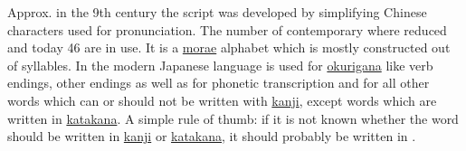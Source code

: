 

Approx. in the 9th century the \lhiragana{} script was developed by simplifying
Chinese characters used for pronunciation. The number of contemporary
\lhiragana{} where reduced and today 46 are in use. It is a
\hyperref[sec:Mora]{morae} alphabet which is mostly constructed out of
syllables. In the modern Japanese language \lhiragana{} is used for
\hyperref[sec:Okurigana]{okurigana} like verb endings, other endings as well as
for phonetic transcription and for all other words which can or should not be
written with \hyperref[sec:Kanji]{kanji}, except words which are written in
\hyperref[sec:Katakana]{katakana}. A simple rule of thumb: if it is not known
whether the word should be written in \hyperref[sec:Kanji]{kanji} or
\hyperref[sec:Katakana]{katakana}, it should probably be written in
\lhiragana{}.
